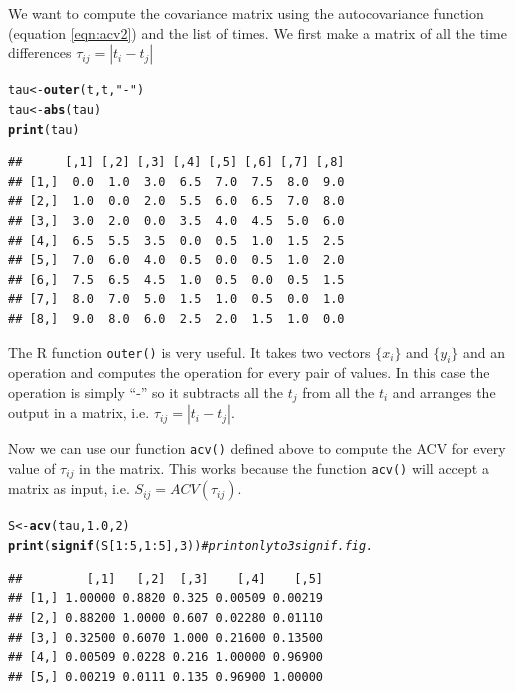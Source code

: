 \documentclass[a4paper,11pt]{article}\usepackage[]{graphicx}\usepackage[]{color}
\makeatletter
\newcommand{\hlnum}[1]{\textcolor[rgb]{0.686,0.059,0.569}{#1}}%
\newcommand{\hlstr}[1]{\textcolor[rgb]{0.192,0.494,0.8}{#1}}%
\newcommand{\hlcom}[1]{\textcolor[rgb]{0.678,0.584,0.686}{\textit{#1}}}%
\newcommand{\hlopt}[1]{\textcolor[rgb]{0,0,0}{#1}}%
\newcommand{\hlstd}[1]{\textcolor[rgb]{0.345,0.345,0.345}{#1}}%
\newcommand{\hlkwb}[1]{\textcolor[rgb]{0.69,0.353,0.396}{#1}}%
\newcommand{\hlkwd}[1]{\textcolor[rgb]{0.737,0.353,0.396}{\textbf{#1}}}%
\newenvironment{kframe}{%
 \def\at@end@of@kframe{}%
 \ifinner\ifhmode%
  \def\at@end@of@kframe{\end{minipage}}%
  \begin{minipage}{\columnwidth}%
 \fi\fi%
 \def\FrameCommand##1{\hskip\@totalleftmargin \hskip-\fboxsep
 \colorbox{shadecolor}{##1}\hskip-\fboxsep
     \hskip-\linewidth \hskip-\@totalleftmargin \hskip\columnwidth}%
 \MakeFramed {\advance\hsize-\width
   \@totalleftmargin\z@ \linewidth\hsize
   \@setminipage}}%
 {\par\unskip\endMakeFramed%
 \at@end@of@kframe}
\newenvironment{knitrout}{}{} %
\makeatother
\begin{document}
We want to compute the covariance matrix using the autocovariance function (equation \ref{eqn:acv2}) and the list of times. We first make a matrix of all the time differences $\tau_{ij} = |t_i - t_j|$

\begin{knitrout}
\color{fgcolor}\begin{kframe}
\begin{alltt}
  \hlstd{tau} \hlkwb{<-} \hlkwd{outer}\hlstd{(t, t,} \hlstr{"-"}\hlstd{)}
  \hlstd{tau} \hlkwb{<-} \hlkwd{abs}\hlstd{(tau)}
  \hlkwd{print}\hlstd{(tau)}
\end{alltt}
\begin{verbatim}
##      [,1] [,2] [,3] [,4] [,5] [,6] [,7] [,8]
## [1,]  0.0  1.0  3.0  6.5  7.0  7.5  8.0  9.0
## [2,]  1.0  0.0  2.0  5.5  6.0  6.5  7.0  8.0
## [3,]  3.0  2.0  0.0  3.5  4.0  4.5  5.0  6.0
## [4,]  6.5  5.5  3.5  0.0  0.5  1.0  1.5  2.5
## [5,]  7.0  6.0  4.0  0.5  0.0  0.5  1.0  2.0
## [6,]  7.5  6.5  4.5  1.0  0.5  0.0  0.5  1.5
## [7,]  8.0  7.0  5.0  1.5  1.0  0.5  0.0  1.0
## [8,]  9.0  8.0  6.0  2.5  2.0  1.5  1.0  0.0
\end{verbatim}
\end{kframe}
\end{knitrout}

The R function {\tt outer()} is very useful. It takes two vectors $\{x_i\}$ and $\{y_i\}$ and an operation and computes the operation for every pair of values. In this case the operation is simply ``-'' so it subtracts all the $t_j$ from all the $t_i$ and arranges the output in a matrix, i.e. $\tau_{ij} = |t_i - t_j|$.

Now we can use our function {\tt acv()} defined above to compute the ACV for every value of $\tau_{ij}$ in the matrix. This works because the function {\tt acv()} will accept a matrix as input, i.e. $S_{ij} = ACV(\tau_{ij})$.

\begin{knitrout}
\color{fgcolor}\begin{kframe}
\begin{alltt}
  \hlstd{S} \hlkwb{<-} \hlkwd{acv}\hlstd{(tau,} \hlnum{1.0}\hlstd{,} \hlnum{2}\hlstd{)}
  \hlkwd{print}\hlstd{(}\hlkwd{signif}\hlstd{(S[}\hlnum{1}\hlopt{:}\hlnum{5}\hlstd{,}\hlnum{1}\hlopt{:}\hlnum{5}\hlstd{],} \hlnum{3}\hlstd{))}   \hlcom{# print only to 3 signif. fig.}
\end{alltt}
\begin{verbatim}
##         [,1]   [,2]  [,3]    [,4]    [,5]
## [1,] 1.00000 0.8820 0.325 0.00509 0.00219
## [2,] 0.88200 1.0000 0.607 0.02280 0.01110
## [3,] 0.32500 0.6070 1.000 0.21600 0.13500
## [4,] 0.00509 0.0228 0.216 1.00000 0.96900
## [5,] 0.00219 0.0111 0.135 0.96900 1.00000
\end{verbatim}
\end{kframe}
\end{knitrout}
\end{document}
